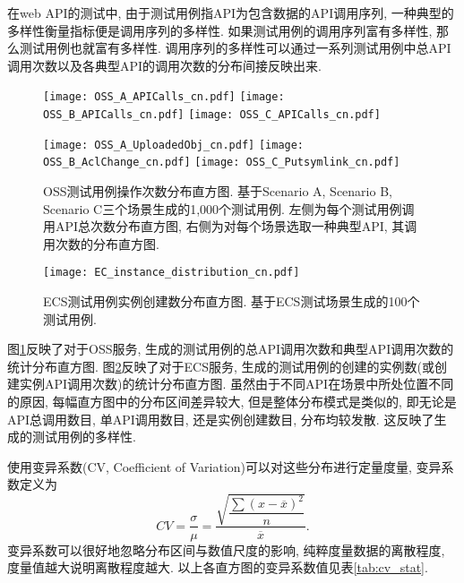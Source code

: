             在web API的测试中, 由于测试用例指API为包含数据的API调用序列, 一种典型的多样性衡量指标便是调用序列的多样性. 如果测试用例的调用序列富有多样性, 那么测试用例也就富有多样性. 调用序列的多样性可以通过一系列测试用例中总API调用次数以及各典型API的调用次数的分布间接反映出来.
            
            \begin{figure}[!htb]
                \begin{minipage}{0.5\textwidth}
                    \centering
                    \texttt{[image: OSS\_A\_APICalls\_cn.pdf]}
                    \texttt{[image: OSS\_B\_APICalls\_cn.pdf]}
                    \texttt{[image: OSS\_C\_APICalls\_cn.pdf]}
                \end{minipage}
                \begin{minipage}{0.5\textwidth}
                    \centering
                    \texttt{[image: OSS\_A\_UploadedObj\_cn.pdf]}
                    \texttt{[image: OSS\_B\_AclChange\_cn.pdf]}
                    \texttt{[image: OSS\_C\_Putsymlink\_cn.pdf]}
                \end{minipage}
                \caption{OSS测试用例操作次数分布直方图. 基于Scenario A, Scenario B, Scenario C三个场景生成的1,000个测试用例. 左侧为每个测试用例调用API总次数分布直方图, 右侧为对每个场景选取一种典型API, 其调用次数的分布直方图.}
                \label{fig:OSS_stat}
            \end{figure}
            
            \begin{figure}[!htb]
                \centering
                \texttt{[image: EC\_instance\_distribution\_cn.pdf]}
                \caption{ECS测试用例实例创建数分布直方图. 基于ECS测试场景生成的100个测试用例.}
                \label{fig:ECS_stat}
            \end{figure}
            
            图\ref{fig:OSS_stat}反映了对于OSS服务, 生成的测试用例的总API调用次数和典型API调用次数的统计分布直方图. 图\ref{fig:ECS_stat}反映了对于ECS服务, 生成的测试用例的创建的实例数(或创建实例API调用次数)的统计分布直方图. 虽然由于不同API在场景中所处位置不同的原因, 每幅直方图中的分布区间差异较大, 但是整体分布模式是类似的, 即无论是API总调用数目, 单API调用数目, 还是实例创建数目, 分布均较发散. 这反映了生成的测试用例的多样性.
            
            使用变异系数(CV, Coefficient of Variation)可以对这些分布进行定量度量, 变异系数定义为
            \begin{equation}
                CV = \dfrac{\sigma}{\mu} = \dfrac{\sqrt{\dfrac{\sum (x - \overline{x})^2}{n}}}{\overline{x}}.
            \end{equation}
            变异系数可以很好地忽略分布区间与数值尺度的影响, 纯粹度量数据的离散程度, 度量值越大说明离散程度越大. 以上各直方图的变异系数值见表\ref{tab:cv_stat}.
            
